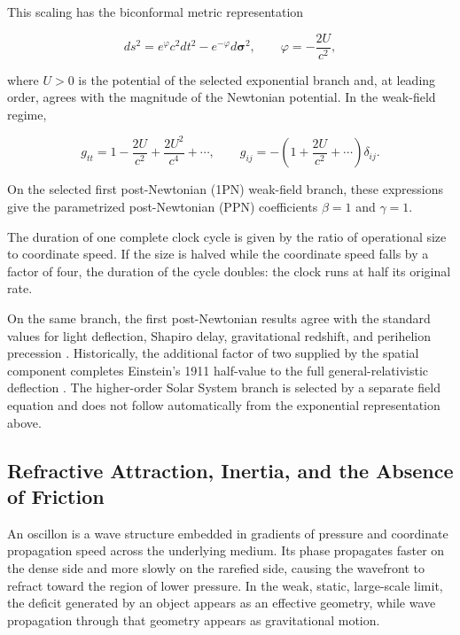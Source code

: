\documentclass[11pt,a4paper]{article}
\begin{document}
This scaling has the biconformal metric representation

\begin{equation}
ds^2=e^\varphi c^2dt^2-e^{-\varphi}d\boldsymbol{\sigma}^2,
\qquad
\varphi=-\frac{2U}{c^2},
\label{eq:bi-conformal-metric}
\end{equation}

where $U>0$ is the potential of the selected exponential branch and, at leading order, agrees with the magnitude of the Newtonian potential. In the weak-field regime,

\begin{equation}
g_{tt}=1-\frac{2U}{c^2}+\frac{2U^2}{c^4}+\cdots,
\qquad
g_{ij}=-\left(1+\frac{2U}{c^2}+\cdots\right)\delta_{ij}.
\label{eq:weak-field-expansion}
\end{equation}

On the selected first post-Newtonian (1PN) weak-field branch, these expressions give the parametrized post-Newtonian (PPN) coefficients $\beta=1$ and $\gamma=1$.

The duration of one complete clock cycle is given by the ratio of operational size to coordinate speed. If the size is halved while the coordinate speed falls by a factor of four, the duration of the cycle doubles: the clock runs at half its original rate.

On the same branch, the first post-Newtonian results agree with the standard values for light deflection, Shapiro delay, gravitational redshift, and perihelion precession \citep{bertotti2003,will2014}. Historically, the additional factor of two supplied by the spatial component completes Einstein's 1911 half-value to the full general-relativistic deflection \citep{einstein1916,shapiro1964}. The higher-order Solar System branch is selected by a separate field equation and does not follow automatically from the exponential representation above.

\subsection{Refractive Attraction, Inertia, and the Absence of Friction}

An oscillon is a wave structure embedded in gradients of pressure and coordinate propagation speed across the underlying medium. Its phase propagates faster on the dense side and more slowly on the rarefied side, causing the wavefront to refract toward the region of lower pressure. In the weak, static, large-scale limit, the deficit generated by an object appears as an effective geometry, while wave propagation through that geometry appears as gravitational motion.
\end{document}
